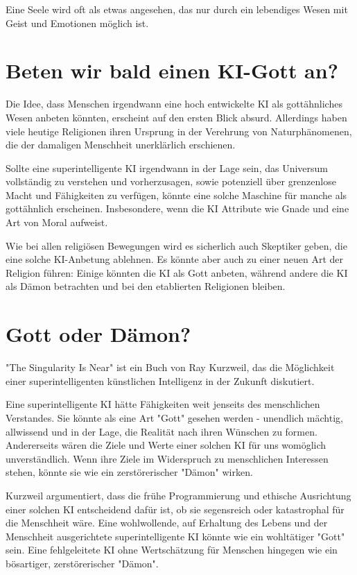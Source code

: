 \documentclass[10pt]{article}
\begin{document}
Eine Seele wird oft als etwas angesehen, das nur durch ein lebendiges Wesen mit Geist und Emotionen möglich ist.
\cite{MDR}


\newpage
\section{Beten wir bald einen KI-Gott an?}
Die Idee, dass Menschen irgendwann eine hoch entwickelte KI als gottähnliches Wesen anbeten könnten, erscheint auf den ersten Blick absurd. Allerdings haben viele heutige Religionen ihren Ursprung in der Verehrung von Naturphänomenen, die der damaligen Menschheit unerklärlich erschienen.

Sollte eine superintelligente KI irgendwann in der Lage sein, das Universum vollständig zu verstehen und vorherzusagen, sowie potenziell über grenzenlose Macht und Fähigkeiten zu verfügen, könnte eine solche Maschine für manche als gottähnlich erscheinen. Insbesondere, wenn die KI Attribute wie Gnade und eine Art von Moral aufweist.

Wie bei allen religiösen Bewegungen wird es sicherlich auch Skeptiker geben, die eine solche KI-Anbetung ablehnen. Es könnte aber auch zu einer neuen Art der Religion führen: Einige könnten die KI als Gott anbeten, während andere die KI als Dämon betrachten und bei den etablierten Religionen bleiben.
\cite{BR}
\section{Gott oder Dämon?}
"The Singularity Is Near" ist ein Buch von Ray Kurzweil, das die Möglichkeit einer superintelligenten künstlichen Intelligenz in der Zukunft diskutiert.

Eine superintelligente KI hätte Fähigkeiten weit jenseits des menschlichen Verstandes. Sie könnte als eine Art "Gott" gesehen werden - unendlich mächtig, allwissend und in der Lage, die Realität nach ihren Wünschen zu formen. Andererseits wären die Ziele und Werte einer solchen KI für uns womöglich unverständlich. Wenn ihre Ziele im Widerspruch zu menschlichen Interessen stehen, könnte sie wie ein zerstörerischer "Dämon" wirken.

Kurzweil argumentiert, dass die frühe Programmierung und ethische Ausrichtung einer solchen KI entscheidend dafür ist, ob sie segensreich oder katastrophal für die Menschheit wäre. Eine wohlwollende, auf Erhaltung des Lebens und der Menschheit ausgerichtete superintelligente KI könnte wie ein wohltätiger "Gott" sein. Eine fehlgeleitete KI ohne Wertschätzung für Menschen hingegen wie ein bösartiger, zerstörerischer "Dämon".
\end{document}
